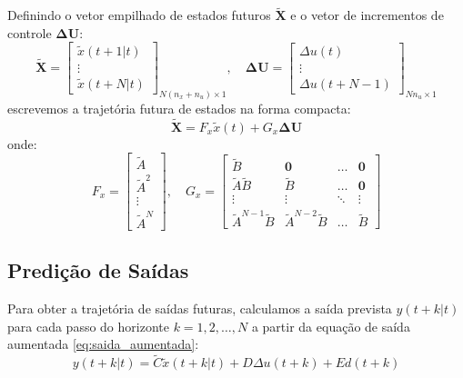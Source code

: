 \documentclass[12pt]{article}
\begin{document}
Definindo o vetor empilhado de estados futuros $\bm{\tilde{X}}$ e o vetor de incrementos de controle $\bm{\Delta U}$:
\begin{equation}
\bm{\tilde{X}} = \begin{bmatrix} \tilde{x}(t+1|t) \\ \vdots \\ \tilde{x}(t+N|t) \end{bmatrix}_{N(n_x+n_u) \times 1}, \quad
\bm{\Delta U} = \begin{bmatrix} \Delta u(t) \\ \vdots \\ \Delta u(t+N-1) \end{bmatrix}_{N n_u \times 1}
\end{equation}
escrevemos a trajetória futura de estados na forma compacta:
\begin{equation}
\label{eq:predicao_estados_matricial}
\bm{\tilde{X}} = F_x \tilde{x}(t) + G_x \bm{\Delta U}
\end{equation}
onde:
\begin{equation}
F_x = \begin{bmatrix} \tilde{A} \\ \tilde{A}^2 \\ \vdots \\ \tilde{A}^N \end{bmatrix}, \quad
G_x = \begin{bmatrix}
\tilde{B} & \bm{0} & \dots & \bm{0} \\
\tilde{A}\tilde{B} & \tilde{B} & \dots & \bm{0} \\
\vdots & \vdots & \ddots & \vdots \\
\tilde{A}^{N-1}\tilde{B} & \tilde{A}^{N-2}\tilde{B} & \dots & \tilde{B}
\end{bmatrix}
\end{equation}

\subsection{Predição de Saídas}
Para obter a trajetória de saídas futuras, calculamos a saída prevista $y(t+k|t)$ para cada passo do horizonte $k = 1, 2, \dots, N$ a partir da equação de saída aumentada \eqref{eq:saida_aumentada}:
\begin{equation}
y(t+k|t) = \tilde{C} \tilde{x}(t+k|t) + D \Delta u(t+k) + E d(t+k)
\end{equation}
\end{document}
